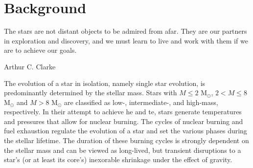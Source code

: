 \chapter{Background}\label{background}

\epigraph{The stars are not distant objects to be admired from afar. They are our partners in exploration and discovery, and we must learn to live and work with them if we are to achieve our goals.}{Arthur C. Clarke}

The evolution of a star in isolation, namely single star evolution, is predominantly determined by the stellar mass. Stars with $M \leq 2$ M$_{\odot}$, $2 < M \leq 8$ M$_{\odot}$ and $M > 8$ M$_{\odot}$ are classified as low-, intermediate-, and high-mass, respectively. In their attempt to achieve \ac{he} and \ac{te}, stars generate temperatures and pressures that allow for nuclear burning. The cycles of nuclear burning and fuel exhaustion regulate the evolution of a star and set the various phases during the stellar lifetime. The duration of these burning cycles is strongly dependent on the stellar mass and can be viewed as long-lived, but transient disruptions to a star's (or at least its core's) inexorable shrinkage under the effect of gravity. %










